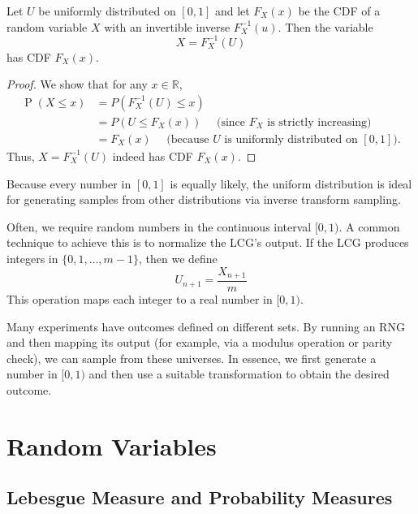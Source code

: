 \documentclass[11pt, headings=standardclasses, parskip=half, twoside]{scrartcl}
\begin{document}
\begin{theorem}
Let $U$ be uniformly distributed on $[0,1]$ and let $F_{X}(x)$ be the CDF of a random variable $X$ with an invertible inverse $F_{X}^{-1}(u)$. Then the variable
\[
X=F_{X}^{-1}(U)
\]
has CDF $F_{X}(x)$.
\end{theorem}

\begin{proof}
We show that for any $x \in \mathbb{R}$,
\[
\begin{aligned}
\operatorname{P}(X \leq x) & =P\left(F_{X}^{-1}(U) \leq x\right) \\
& =P\left(U \leq F_{X}(x)\right) \quad \text { (since } F_{X} \text { is strictly increasing) } \\
& =F_{X}(x) \quad \text { (because } U \text { is uniformly distributed on }[0,1]).
\end{aligned}
\]
Thus, $X=F_{X}^{-1}(U)$ indeed has CDF $F_{X}(x)$.
\end{proof}

Because every number in $[0,1]$ is equally likely, the uniform distribution is ideal for generating samples from other distributions via inverse transform sampling.




Often, we require random numbers in the continuous interval $[0,1)$.
A common technique to achieve this is to normalize the LCG's output.
If the LCG produces integers in $\{0,1, \ldots, m-1\}$, then we define
\[
\boxed{
U_{n+1} = \frac{X_{n+1}}{m}
}
\]
This operation maps each integer to a real number in $[0,1)$.

Many experiments have outcomes defined on different sets.
By running an RNG and then mapping its output (for example, via a modulus operation or parity check), we can sample from these universes.
In essence, we first generate a number in $[0,1)$ and then use a suitable transformation to obtain the desired outcome.


\pagebreak[2]

\section{Random Variables}

\subsection{Lebesgue Measure and Probability Measures}
\end{document}
